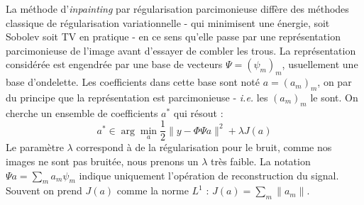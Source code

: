 %
%
% 
%
%
%

La méthode d'\emph{inpainting} par régularisation parcimonieuse diffère des méthodes classique de régularisation variationnelle - qui minimisent une énergie, soit Sobolev soit TV en pratique - en ce sens qu'elle passe par une représentation parcimonieuse de l'image avant d'essayer de combler les trous. La représentation considérée est engendrée par une base de vecteurs $\Psi = (\psi_m)_m$, usuellement une base d'ondelette. Les coefficients dans cette base sont noté $a =(a_m)_m$, on par du principe que la représentation est parcimonieuse - \emph{i.e.} les $(a_m)_m$ le sont. On cherche un ensemble de coefficients $a^*$ qui résout :
\begin{equation}
a^* \in \arg \min_a \frac{1}{2} \| y - \Phi \Psi a \|^2 + \lambda J(a)
\end{equation}
Le paramètre $\lambda$ correspond à de la régularisation pour le bruit, comme nos images ne sont pas bruitée, nous prenons un $\lambda$ très faible. La notation $\Psi a = \sum_m a_m \psi_m$ indique uniquement l'opération de reconstruction du signal. Souvent on prend $J(a)$ comme la norme $L^1$ : $J(a) = \sum_m \|a_m \|$.

